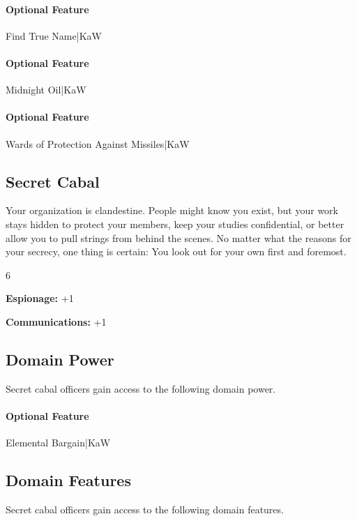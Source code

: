 \documentclass[10pt,a4paper,twoside,bg=print,twocolumn,openany,nodeprecatedcode]{dndbook}
\begin{document}
\paragraph{Optional Feature}
Find True Name|KaW

\paragraph{Optional Feature}
Midnight Oil|KaW

\paragraph{Optional Feature}
Wards of Protection Against Missiles|KaW

\subsection{Secret Cabal}
Your organization is clandestine. People might know you exist, but your work stays hidden to protect your members, keep your studies confidential, or better allow you to pull strings from behind the scenes. No matter what the reasons for your secrecy, one thing is certain: You look out for your own first and foremost.

{\par \vspace { 9pt plus 3pt minus 3pt } \noindent  {} \nopagebreak }

\begin{itemize}
\begin{multicols}{6}
\item \textbf{Espionage:} +1
\item \textbf{Communications:} +1
\end{multicols}

\end{itemize}

\subsection{Domain Power}
Secret cabal officers gain access to the following domain power.

\paragraph{Optional Feature}
Elemental Bargain|KaW

\subsection{Domain Features}
Secret cabal officers gain access to the following domain features.
\end{document}
